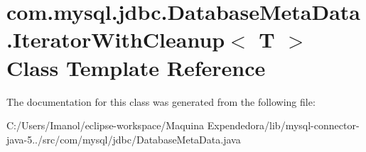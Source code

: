 \hypertarget{classcom_1_1mysql_1_1jdbc_1_1_database_meta_data_1_1_iterator_with_cleanup}{}\section{com.\+mysql.\+jdbc.\+Database\+Meta\+Data.\+Iterator\+With\+Cleanup$<$ T $>$ Class Template Reference}
\label{classcom_1_1mysql_1_1jdbc_1_1_database_meta_data_1_1_iterator_with_cleanup}


The documentation for this class was generated from the following file\+:\begin{DoxyCompactItemize}
\item 
C\+:/\+Users/\+Imanol/eclipse-\/workspace/\+Maquina Expendedora/lib/mysql-\/connector-\/java-\/5../src/com/mysql/jdbc/Database\+Meta\+Data.\+java\end{DoxyCompactItemize}
